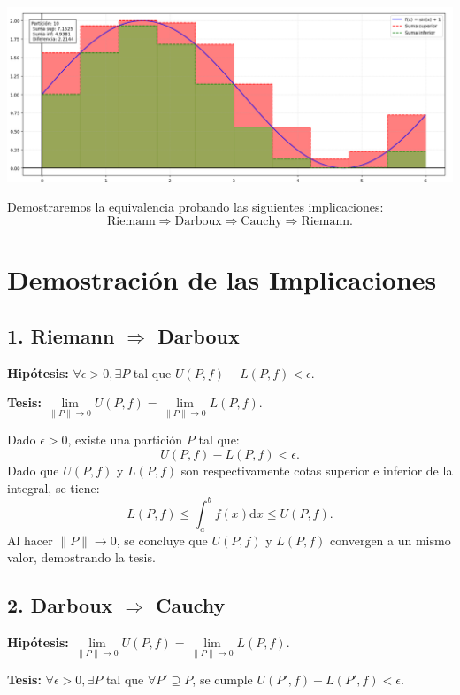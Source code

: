 \documentclass{article}
\begin{document}
\begin{center}
    \includegraphics[width=1\textwidth]{Figure_1.png}
\end{center}

Demostraremos la equivalencia probando las siguientes implicaciones:
\[
\text{Riemann} \Rightarrow \text{Darboux} \Rightarrow \text{Cauchy} \Rightarrow \text{Riemann}.
\]

\section*{Demostración de las Implicaciones}

\subsection*{1. Riemann $\Rightarrow$ Darboux}
\textbf{Hipótesis:} $\forall \epsilon > 0, \exists P$ tal que $U(P, f) - L(P, f) < \epsilon$.

\textbf{Tesis:} $\lim\limits_{\lVert P \rVert \to 0} U(P, f) = \lim\limits_{\lVert P \rVert \to 0} L(P, f)$.

Dado $\epsilon > 0$, existe una partición $P$ tal que:
\[
U(P, f) - L(P, f) < \epsilon.
\]
Dado que $U(P, f)$ y $L(P, f)$ son respectivamente cotas superior e inferior de la integral, se tiene:
\[
L(P, f) \leq \int_a^b f(x) \mathrm{d}x \leq U(P, f).
\]
Al hacer $\lVert P \rVert \to 0$, se concluye que $U(P, f)$ y $L(P, f)$ convergen a un mismo valor, demostrando la tesis.

\subsection*{2. Darboux $\Rightarrow$ Cauchy}
\textbf{Hipótesis:} $\lim\limits_{\lVert P \rVert \to 0} U(P, f) = \lim\limits_{\lVert P \rVert \to 0} L(P, f)$.

\textbf{Tesis:} $\forall \epsilon > 0, \exists P$ tal que $\forall P' \supseteq P$, se cumple $U(P', f) - L(P', f) < \epsilon$.
\end{document}
